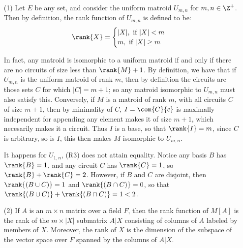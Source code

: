 \begin{example}\label{1.12}
    \begin{enumerate}
        \item[(1)] Let $E$ be any set, and consider the uniform matroid
            $U_{m,n}$ for $m,n \in \Z^+$. Then by definition, the rank function
            of  $U_{m,n}$ is defined to be:
            \begin{equation*}
                \rank{X}=\begin{cases}
                            |X|, \text{ if } |X|<m \\
                            m, \text{ if } |X| \geq m \\
                         \end{cases}
            \end{equation*}

            In fact, any matroid is isomorphic to a uniform matroid if and only
            if there are no circuits of size less than $\rank{M}+1$. By
            definition, we have that if $U_{m,n}$ is the uniform matroid of
            rank $m$, then by definition the circuits are those sets  $C$ for
            which  $|C|=m+1$; so any matroid isomorphic to  $U_{m,n}$ must also
            satisfy this. Conversely, if $M$ is a matroid of rank $m$, with all
            circuits $C$ of size $m+1$, then by minimality of $C$,
            $I=\com{C}{c}$ is maximally independent for appending any element
            makes it of size $m+1$, which necesarily makes it a circuit. Thus
            $I$ is a base, so that $\rank{I}=m$, since $C$ is arbitrary, so is
            $I$, this then makes  $M$ isomorphic to $U_{m,n}$.

            It happens for $U_{1,n}$, (R3) does not attain equality. Notice any
            basis $B$ has  $\rank{B}=1$, and any circuit $C$ has
            $\rank{C}=1$, so $\rank{B}+\rank{C}=2$. However, if $B$ and $C$ are
            disjoint, then  $\rank{(B \cup C)}=1$ and $\rank{(B \cap C)}=0$, so
            that $\rank{(B \cup C)}+\rank{(B \cap C)}=1<2$.

        \item[(2)] If $A$ is an  $m \times n$ matrix over a field  $F$, then the
        rank function of  $M[A]$ is the rank of the $m \times |X|$ submatrix
        $A|X$ consisting of columns of $A$ labeled by members of $X$. Moreover,
        the rank of $X$ is the dimension of the subspace of the vector space
        over  $F$ spanned by the columns of  $A|X$.


\end{enumerate}
\end{example}
